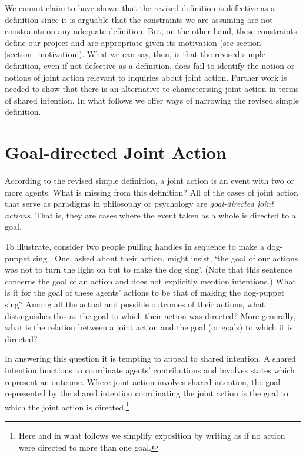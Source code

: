 \documentclass[12pt,a4paper]{extarticle}
\begin{document}
We cannot claim to have shown that the revised definition is defective as a definition since it is arguable that the constraints we are assuming are not constraints on any adequate definition.
But, on the other hand, these constraints define our project and are appropriate given its motivation (see section \vref{section_motivation}).
What we can say, then, is that the revised simple definition, even if not defective as a definition, does fail to identify the notion or notions of joint action relevant to inquiries about joint action.
Further work is needed to show that there is an alternative to characterising joint action in terms of shared intention.
In what follows we offer ways of narrowing the revised simple definition.



\section{Goal-directed Joint Action}
According to the revised simple definition, a  joint action is an event with two or more agents.
What is missing from this definition?
All of the cases of joint action that serve as paradigms in  philosophy or psychology are \emph{goal-directed joint actions}.
That is, they are cases where the event taken as a whole is directed to a goal.

To illustrate, consider two people pulling handles in sequence to make a dog-puppet sing \citep[this example is from][]{Brownell:2006gu}.
One, asked about their action, might insist, `the goal of our actions was not to turn the light on but to make the dog sing'.
(Note that this sentence concerns the goal of an action and does not explicitly mention intentions.)
What is it for the goal of these agents' actions to be that of making the dog-puppet sing?
Among all the actual and possible outcomes of their actions, what distinguishes this as the goal to which their action was directed?
More generally, {what is the relation between a joint action and the goal (or goals) to which it is directed?}

In answering this question it is tempting to appeal to shared intention.
A shared intention  functions to coordinate agents' contributions and involves states which represent an outcome.
Where joint action involves shared intention, 
the goal represented by the shared intention coordinating the joint action is the goal to which the joint action is directed.\footnote{
Here and in what follows we simplify exposition by writing as if no action were directed to more than one goal.
}
\end{document}
